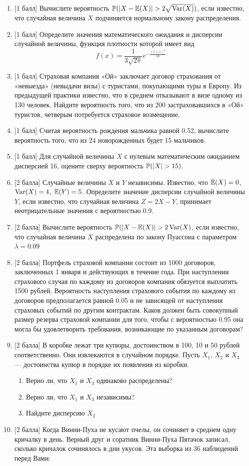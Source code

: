 \documentclass[12pt, a4paper]{article}\usepackage[]{graphicx}\usepackage[]{color}
\begin{document}
	\begin{enumerate}
		\item $[$1 балл] Вычислите вероятность $\P(|X-\E(X)|>2\sqrt{\Var(X)})$, если известно, что
		случайная величина $X$ подчиняется нормальному закону распределения.
		\item $[$1 балл] Определите значения математического ожидания и дисперсии случайной
		величины, функция плотности которой имеет вид
		\[
		f(x)=\frac{1}{3\sqrt{2\pi}}e^{-\frac{(x+1)^2}{18}}
		\]
		\item $[$1 балл] Страховая компания «Ой» заключает договор страхования от «невыезда» (невыдачи визы) с туристами, покупающими туры в Европу. Из предыдущей практики известно,
		что в среднем отказывают в визе одному из 130 человек. Найдите вероятность того, что из 200
		застраховавшихся в «Ой» туристов, четверым потребуется страховое возмещение.
		\item $[$1 балл] Считая вероятность рождения мальчика равной 0.52, вычислите вероятность того, что
		из 24 новорожденных будет 15 мальчиков.
		\item $[$1 балл] Для случайной величины $X$ с нулевым математическим ожиданием
		дисперсией 16, оцените сверху вероятность $\P(|X| > 15)$.
		\item $[$2 балла] Случайные величины $X$ и $Y$ независимы. Известно, что $\E(X)=0$, $\Var(X)=4$, $\E(Y)=5$. Определите значение дисперсии случайной величины $Y$, если известно, что случайная величина $Z=2X-Y$, принимает неотрицательные значения с вероятностью 0.9.
		\item $[$2 балла] Вычислите вероятность $\P(| X - \E(X)| > 2\Var(X)$, если известно, что
		случайная величина $X$ распределена по закону Пуассона с параметром $\lambda = 0.09$
		\item $[$2 балла] Портфель страховой компании состоит из 1000 договоров, заключенных 1
		января и действующих в течение года. При наступлении страхового случая по каждому из
		договоров компания обязуется выплатить 1500 рублей. Вероятность наступления страхового
		события по каждому из договоров предполагается равной 0.05 и не зависящей от наступления
		страховых событий по другим контрактам. Каков должен быть совокупный размер резерва
		страховой компании для того, чтобы с вероятностью 0.95 она могла бы удовлетворить
		требования, возникающие по указанным договорам?
		\item $[$2 балла] В коробке лежат три купюры, достоинством в 100, 10 и 50 рублей
		соответственно. Они извлекаются в случайном порядке. Пусть $X_1$, $X_2$ и $X_3$ — достоинства
		купюр в порядке их появления из коробки.
		\begin{enumerate}
			\item Верно ли, что $X_1$ и $X_3$ одинаково распределены?
			\item Верно ли, что $X_1$ и $X_3$ независимы?
			\item Найдите дисперсию $X_2$
		\end{enumerate}
		\item $[$2 балла] Когда Винни-Пуха не кусают пчелы, он сочиняет в среднем одну кричалку в день.
		Верный друг и соратник Винни-Пуха Пятачок записал, сколько кричалок сочинялось в дни
		укусов. Эта выборка из 36 наблюдений перед Вами:


\end{enumerate}
\end{document}
